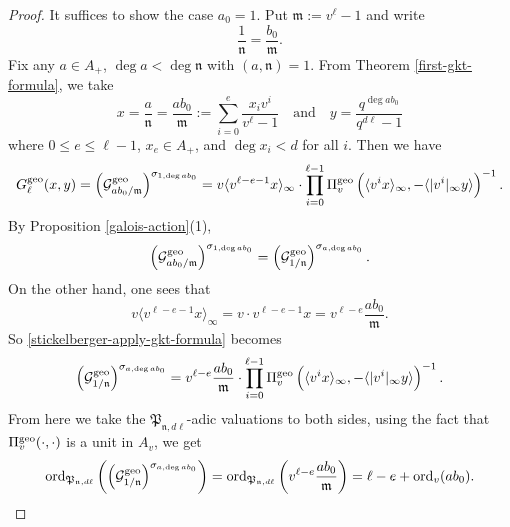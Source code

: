 \documentclass[11pt]{amsart}
\theoremstyle{plain}
\theoremstyle{definition}
\theoremstyle{remark}
\numberwithin{equation}{section}
\newcommand{\mfk}{\mathfrak{m}}
\newcommand{\nfk}{\mathfrak{n}}
\newcommand{\Pfk}{\mathfrak{P}}
\newcommand{\Gcal}{\mathcal{G}}
\newcommand{\ord}{\operatorname{ord}}
\newcommand{\ang}[1]{\langle #1 \rangle}
\newcommand{\anginf}[1]{\langle #1 \rangle_\infty}
\newcommand{\vgf}{\Pi_v^{\textnormal{geo}}}
\newcommand{\bggs}{\Gcal^{\textnormal{geo}}}
\newcommand{\ggs}{G_\l^{\textnormal{geo}}}
\let\l\ell
\begin{document}
	\begin{proof}
		It suffices to show the case $a_0 = 1$.
		Put $\mfk := v^\l-1$ and write
		$$
		\frac{1}{\nfk} = \frac{b_0}{\mfk}.
		$$
		Fix any $a \in A_+$, $\deg a< \deg \nfk$ with $(a,\nfk) = 1$.
		From Theorem \ref{first-gkt-formula}, we take
		$$
		x
		= \frac{a}{\nfk}
		= \frac{ab_0}{\mfk}
		:= \sum_{i=0}^{e} \frac{x_i v^i}{v^\l-1}
		\quad
		\text{and}
		\quad
		y = \frac{q^{\deg ab_0}}{q^{d\l}-1}
		$$
		where $0 \leq e \leq \l-1$, $x_e \in A_+$, and $\deg x_i < d$ for all $i$.
		Then we have
		\begin{equation}    \label{stickelberger-apply-gkt-formula}
			\ggs (x,y)
			= \left(\bggs_{ab_0/\mfk}\right)^{\sigma_{1,\deg ab_0}}
			= v\anginf{v^{\l-e-1}x} \cdot
			\prod_{i=0}^{\l-1} \vgf \left( \anginf{v^ix}, -\ang{|v^i|_\infty y} \right)^{-1}.
		\end{equation}
		By Proposition \ref{galois-action}(1),
		$$
		\left(\bggs_{ab_0/\mfk}\right)^{\sigma_{1,\deg ab_0}}
		= \left(\bggs_{1/\nfk}\right)^{\sigma_{a,\deg ab_0}}.
		$$
		On the other hand, one sees that
		$$
		v\anginf{v^{\l-e-1}x}
		= v \cdot v^{\l-e-1} x
		= v^{\l-e} \frac{ab_0}{\mfk}.
		$$
		So \eqref{stickelberger-apply-gkt-formula} becomes
		$$
		\left(\bggs_{1/\nfk}\right)^{\sigma_{a,\deg ab_0}}
		= v^{\l-e} \frac{ab_0}{\mfk} \cdot \prod_{i=0}^{\l-1} \vgf \left( \anginf{v^ix}, -\ang{|v^i|_\infty y} \right)^{-1}.
		$$
		From here we take the $\Pfk_{\nfk,d\l}$-adic valuations to both sides, using the fact that $\vgf(\cdot , \cdot)$ is a unit in $A_v$, we get
		$$
		\ord_{\Pfk_{\nfk,d\l}} \left( \left(\bggs_{1/\nfk}\right)^{\sigma_{a,\deg ab_0}} \right)
		= \ord_{\Pfk_{\nfk,d\l}} \left( v^{\l-e} \frac{ab_0}{\mfk} \right)
		= \l - e + \ord_v(ab_0).
		$$
		

\end{proof}
\end{document}
